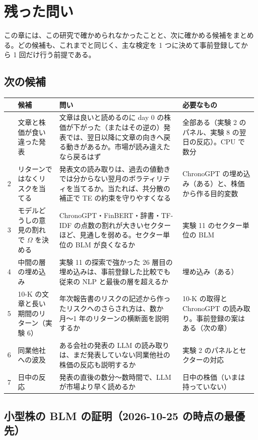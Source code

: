 \chapter{残った問い}\label{ch:open}

この章には、この研究で確かめられなかったことと、次に確かめる候補をまとめる。どの候補も、これまでと同じく、主な検定を 1 つに決めて事前登録してから 1 回だけ行う前提である。

\section{次の候補}

\begin{longtable}{P{0.6cm}P{4.2cm}P{5.4cm}P{4.2cm}}
\toprule
 & \textbf{候補} & \textbf{問い} & \textbf{必要なもの} \\
\midrule
\endhead
\bottomrule
{} & 文章と株価が食い違った発表 & 文章は良いと読めるのに day 0 の株価が下がった（またはその逆の）発表では、翌日以降に文章の向きへ戻る動きがあるか。市場が読み違えたなら戻るはず & 全部ある（実験 2 のパネル、実験 8 の翌日の反応）。CPU で数分 \\
2 & リターンではなくリスクを当てる & 発表文の読み取りは、過去の値動きでは分からない翌月のボラティリティを当てるか。当たれば、共分散の補正で TE の約束を守りやすくなる & ChronoGPT の埋め込み（ある）と、株価から作る目的変数 \\
3 & モデルどうしの意見の割れで $\Omega$ を決める & ChronoGPT・FinBERT・辞書・TF-IDF の点数の割れが大きいセクターほど、見通しを弱める。セクター単位の BLM が良くなるか & 実験 11 のセクター単位の BLM \\
4 & 中間の層の埋め込み & 実験 11 の探索で強かった 26 層目の埋め込みは、事前登録した比較でも従来の NLP と最後の層を超えるか & 埋め込み（ある） \\
5 & 10-K の文章と長い期間のリターン（実験 6） & 年次報告書のリスクの記述から作ったリスクへのさらされ方は、数か月〜1 年のリターンの横断面を説明するか & 10-K の取得と ChronoGPT の読み取り。事前登録の案はある（次の章） \\
6 & 同業他社への波及 & ある会社の発表の LLM の読み取りは、まだ発表していない同業他社の株価の反応も説明するか & 実験 2 のパネルとセクターの対応 \\
7 & 日中の反応 & 発表の直後の数分〜数時間で、LLM が市場より早く読めるか & 日中の株価（いまは持っていない） \\
\end{longtable}

\section{小型株の BLM の証明（2026-10-25 の時点の最優先）}

